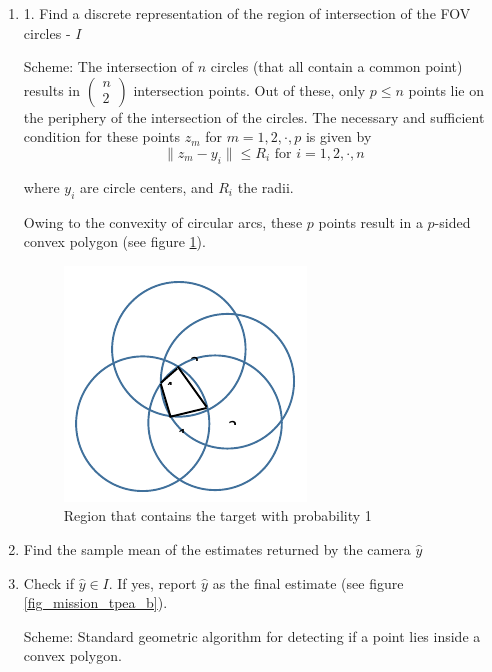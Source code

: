\begin{enumerate}
\item 
1. Find a discrete representation of the region of intersection of the FOV circles - $I$

Scheme:
The intersection of $n$ circles (that all contain a common point) results in $\left( \begin{array}{c} n  \\ 2 \end{array} \right)$ intersection points. Out of these, only $p \leq n$ points lie on the periphery of the intersection of the circles. The necessary and sufficient condition for these points $z_m$ for $m = 1,2, \cdot , p$ is given by
\[ \|z_m - y_i\| \leq R_i \textrm{ for } i=1,2,\cdot,n  \]

where $y_i$ are circle centers, and $R_i$ the radii.

Owing to the convexity of circular arcs, these $p$ points 
result in a $p$-sided convex polygon (see figure \ref{fig_mission_tpea_a}).

\begin{figure}
\centering
\includegraphics[scale=1]{Figures/mission_tpea_a}
\caption{Region that contains the target with probability 1}
\label{fig_mission_tpea_a}
\end{figure}

\item  Find the sample mean of the estimates returned by the camera $\hat{y}$

\item  Check if $\hat{y} \in I$. If yes, report $\hat{y}$ as the final estimate (see figure \ref{fig_mission_tpea_b}).

Scheme:
Standard geometric algorithm for detecting if a point lies
inside a convex polygon. 


\end{enumerate}

